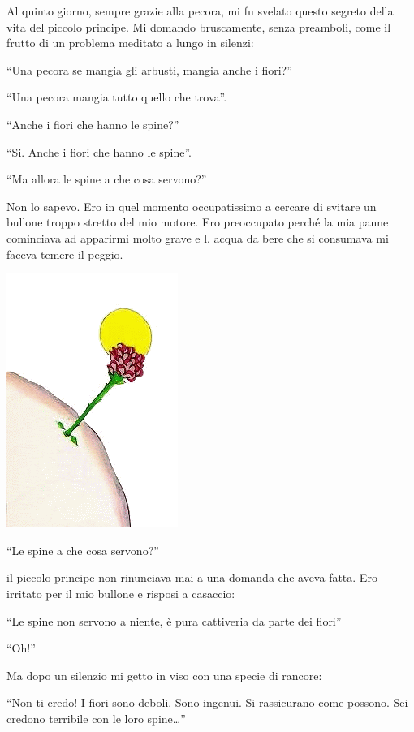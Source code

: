 \documentclass[11pt]{scrbook}
\begin{document}
Al quinto giorno, sempre grazie alla pecora, mi fu svelato questo
segreto della vita del piccolo principe. Mi domando bruscamente, senza
preamboli, come il frutto di un problema meditato a lungo in silenzi:

``Una pecora se mangia gli arbusti, mangia anche i fiori?''

``Una pecora mangia tutto quello che trova''.

``Anche i fiori che hanno le spine?''

``Si. Anche i fiori che hanno le spine''.

``Ma allora le spine a che cosa servono?''

Non lo sapevo. Ero in quel momento occupatissimo a cercare di svitare un
bullone troppo stretto del mio motore. Ero preoccupato perché la mia
panne cominciava ad apparirmi molto grave e l. acqua da bere che si
consumava mi faceva temere il peggio.

\begin{center}
\includegraphics{img/7a}

\end{center}

``Le spine a che cosa servono?''

il piccolo principe non rinunciava mai a una domanda che aveva fatta.
Ero irritato per il mio bullone e risposi a casaccio:

``Le spine non servono a niente, è pura cattiveria da parte dei fiori''

``Oh!''

Ma dopo un silenzio mi getto in viso con una specie di rancore:

``Non ti credo! I fiori sono deboli. Sono ingenui. Si rassicurano come
possono. Sei credono terribile con le loro spine\ldots{}''
\end{document}
